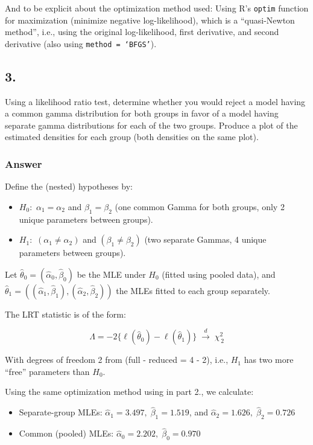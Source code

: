 \documentclass[
]{article}
\providecommand{\tightlist}{%
  \setlength{\itemsep}{0pt}\setlength{\parskip}{0pt}}
\begin{document}
And to be explicit about the optimization method used: Using R's
\texttt{optim} function for maximization (minimize negative
log-likelihood), which is a ``quasi-Newton method'', i.e., using the
original log-likelihood, first derivative, and second derivative (also
using \texttt{method\ =\ ‘BFGS’}).

\newpage

\subsection{3.}\label{section-2}

Using a likelihood ratio test, determine whether you would reject a
model having a common gamma distribution for both groups in favor of a
model having separate gamma distributions for each of the two groups.
Produce a plot of the estimated densities for each group (both densities
on the same plot).

\subsubsection{Answer}\label{answer-2}

Define the (nested) hypotheses by:

\begin{itemize}
\tightlist
\item
  \(H_0:\) \(\alpha_1=\alpha_2\) and \(\beta_1=\beta_2\) (one common
  Gamma for both groups, only 2 unique parameters between groups).
\item
  \(H_1:\) \((\alpha_1 \neq \alpha_2)\) and \((\beta_1 \neq \beta_2)\)
  (two separate Gammas, 4 unique parameters between groups).
\end{itemize}

Let \(\hat\theta_0=(\hat\alpha_0,\hat\beta_0)\) be the MLE under \(H_0\)
(fitted using pooled data), and
\(\hat\theta_1=((\hat\alpha_1,\hat\beta_1),(\hat\alpha_2,\hat\beta_2))\)
the MLEs fitted to each group separately.

The LRT statistic is of the form:

\[
\Lambda = - 2\bigl\{\ell(\hat\theta_0) - \ell(\hat\theta_1)\bigr\}
\;\xrightarrow{d}\; \chi^2_{\,2}
\]

With degrees of freedom 2 from (full - reduced = 4 - 2), i.e., \(H_1\)
has two more ``free'' parameters than \(H_0\).

Using the same optimization method using in part 2., we calculate:

\begin{itemize}
\item
  Separate-group MLEs: \(\hat\alpha_1=3.497,\;\hat\beta_1=1.519\), and
  \(\hat\alpha_2=1.626,\;\hat\beta_2=0.726\)
\item
  Common (pooled) MLEs: \(\hat\alpha_0=2.202,\;\hat\beta_0=0.970\)
\end{itemize}
\end{document}
